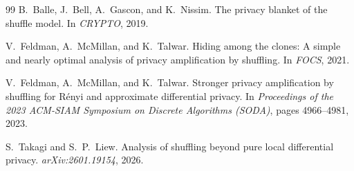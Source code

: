 \documentclass{article}
\newcommand{\1}{\mathbf 1}
\begin{document}
\begin{thebibliography}{99}
B.~Balle, J.~Bell, A.~Gascon, and K.~Nissim.
The privacy blanket of the shuffle model.
In \textit{CRYPTO}, 2019.

V.~Feldman, A.~McMillan, and K.~Talwar.
Hiding among the clones: A simple and nearly optimal analysis of privacy amplification by shuffling.
In \textit{FOCS}, 2021.

V.~Feldman, A.~McMillan, and K.~Talwar.
Stronger privacy amplification by shuffling for R\'enyi and approximate differential privacy.
In \textit{Proceedings of the 2023 ACM-SIAM Symposium on Discrete Algorithms (SODA)}, pages 4966--4981, 2023.

S.~Takagi and S.~P.~Liew.
Analysis of shuffling beyond pure local differential privacy.
\textit{arXiv:2601.19154}, 2026.

\end{thebibliography}
\endgroup
\end{document}
